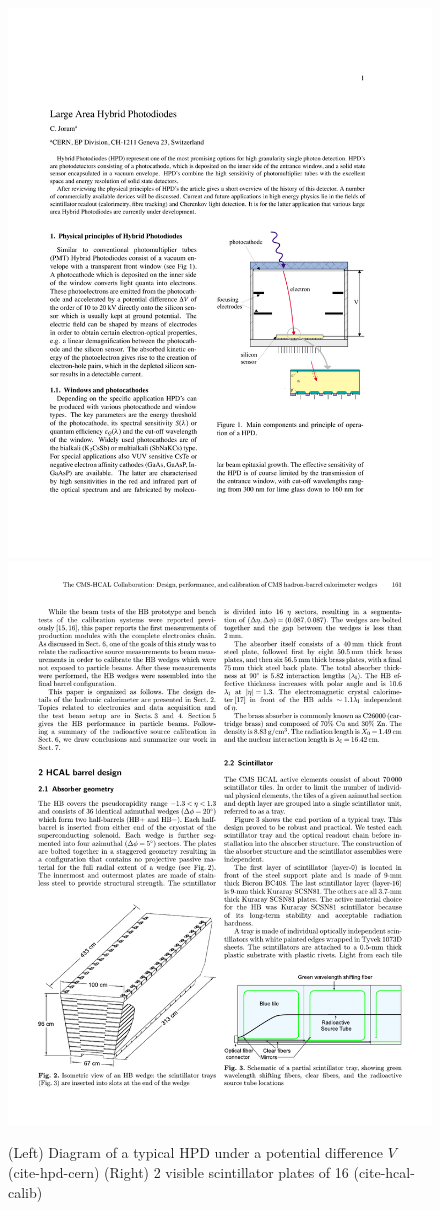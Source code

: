 \begin{figure}
\begin{center}
\includegraphics[width=.45\textwidth]{pics/HPD}
\includegraphics[width=.45\textwidth]{pics/HCALfiber}
\end{center}
\caption{(Left) Diagram of a typical HPD under a potential difference $V$ (cite-hpd-cern) (Right) 2 visible scintillator 
plates of 16 (cite-hcal-calib)}
\label{fig:hpd_fiber}
\end{figure}

